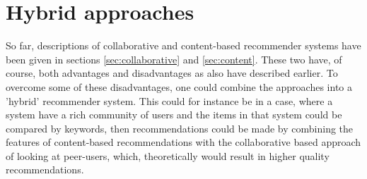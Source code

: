 \newpage
\section{Hybrid approaches}
\label{sec:hybrid}
So far, descriptions of collaborative and content-based recommender systems have been given in sections \ref{sec:collaborative} and \ref{sec:content}. These two have, of course, both advantages and disadvantages as also have described earlier. To overcome some of these disadvantages, one could combine the approaches into a 'hybrid' recommender system. This could for instance be in a case, where a system have a rich community of users and the items in that system could be compared by keywords, then recommendations could be made by combining the features of content-based recommendations with the collaborative based approach of looking at peer-users, which, theoretically would result in higher quality recommendations.\newline

